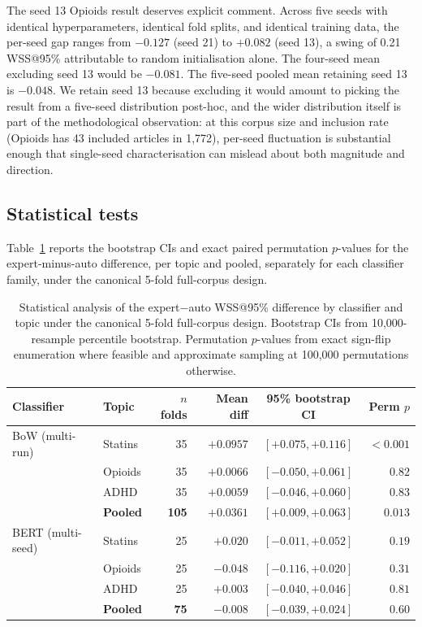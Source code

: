 \documentclass[11pt,a4paper]{article}
\begin{document}
The seed 13 Opioids result deserves explicit comment. Across five seeds with identical hyperparameters, identical fold splits, and identical training data, the per-seed gap ranges from $-0.127$ (seed 21) to $+0.082$ (seed 13), a swing of 0.21 WSS@95\% attributable to random initialisation alone. The four-seed mean excluding seed 13 would be $-0.081$. The five-seed pooled mean retaining seed 13 is $-0.048$. We retain seed 13 because excluding it would amount to picking the result from a five-seed distribution post-hoc, and the wider distribution itself is part of the methodological observation: at this corpus size and inclusion rate (Opioids has 43 included articles in 1,772), per-seed fluctuation is substantial enough that single-seed characterisation can mislead about both magnitude and direction.

\subsection{Statistical tests}

Table~\ref{tab:stats} reports the bootstrap CIs and exact paired permutation $p$-values for the expert-minus-auto difference, per topic and pooled, separately for each classifier family, under the canonical 5-fold full-corpus design.

\begin{table}[h]
\centering
\small
\begin{tabular}{llrrcr}
\toprule
Classifier & Topic & $n$ folds & Mean diff & 95\% bootstrap CI & Perm $p$ \\
\midrule
BoW (multi-run)  & Statins         & 35  & $+0.0957$ & $[+0.075, +0.116]$ & $< 0.001$ \\
                 & Opioids         & 35  & $+0.0066$ & $[-0.050, +0.061]$ & $0.82$ \\
                 & ADHD            & 35  & $+0.0059$ & $[-0.046, +0.060]$ & $0.83$ \\
                 & \textbf{Pooled} & \textbf{105} & \textbf{$+0.0361$} & \textbf{$[+0.009, +0.063]$} & \textbf{$0.013$} \\
\midrule
BERT (multi-seed) & Statins        & 25  & $+0.020$  & $[-0.011, +0.052]$ & $0.19$ \\
                 & Opioids         & 25  & $-0.048$  & $[-0.116, +0.020]$ & $0.31$ \\
                 & ADHD            & 25  & $+0.003$  & $[-0.040, +0.046]$ & $0.81$ \\
                 & \textbf{Pooled} & \textbf{75} & \textbf{$-0.008$} & \textbf{$[-0.039, +0.024]$} & \textbf{$0.60$} \\
\bottomrule
\end{tabular}
\caption{Statistical analysis of the expert$-$auto WSS@95\% difference by classifier and topic under the canonical 5-fold full-corpus design. Bootstrap CIs from 10,000-resample percentile bootstrap. Permutation $p$-values from exact sign-flip enumeration where feasible and approximate sampling at 100,000 permutations otherwise.}
\label{tab:stats}
\end{table}
\end{document}
